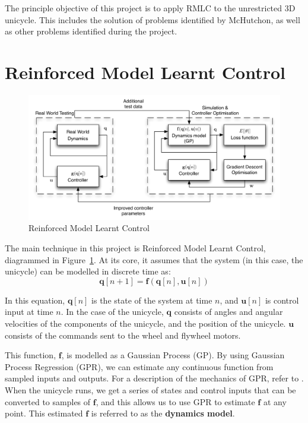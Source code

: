 \documentclass{IIBproject}
\begin{document}
The principle objective of this project is to apply RMLC to the unrestricted
3D unicycle. This includes the solution of problems identified by McHutchon,
as well as other problems identified during the project.


\section{Reinforced Model Learnt Control}

\begin{figure}[htbp]
  \begin{center}
    \includegraphics[width=14cm]{figures/GPRMLC.pdf}
    \end{center}
    \caption{Reinforced Model Learnt Control}
    \label{fig:rmlc_flowchart}
    \end{figure}

The main technique in this project is Reinforced Model Learnt Control,
diagrammed in Figure~\ref{fig:rmlc_flowchart}. At its core, it assumes that
the system (in this case, the unicycle) can be modelled in discrete time as:
\[
  \boldsymbol{q}[n+1] = \boldsymbol{f}(\boldsymbol{q}[n],
  \boldsymbol{u}[n])
\]

In this equation, $\boldsymbol{q}[n]$ is the state of the system at time $n$,
and $\boldsymbol{u}[n]$ is control input at time $n$. In the case of the
unicycle, $\boldsymbol{q}$ consists of angles and angular velocities of the
components of the unicycle, and the position of the unicycle.
$\boldsymbol{u}$ consists of the commands sent to the wheel and flywheel
motors.

This function, $\boldsymbol{f}$, is modelled as a Gaussian Process (GP). By
using Gaussian Process Regression (GPR), we can estimate any continuous
function from sampled inputs and outputs. For a description of the mechanics
of GPR, refer to \cite{ref:gpml}. When the unicycle runs, we get
a series of states and control inputs that can be converted to samples of
$\boldsymbol{f}$, and this allows us to use GPR to estimate
$\boldsymbol{f}$ at any point. This estimated $\boldsymbol{f}$ is referred to
as the \textbf{dynamics model}.
\end{document}
